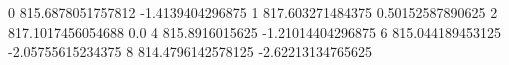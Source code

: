 0 815.6878051757812 -1.4139404296875
1 817.603271484375 0.50152587890625
2 817.1017456054688 0.0
4 815.8916015625 -1.21014404296875
6 815.044189453125 -2.05755615234375
8 814.4796142578125 -2.62213134765625
